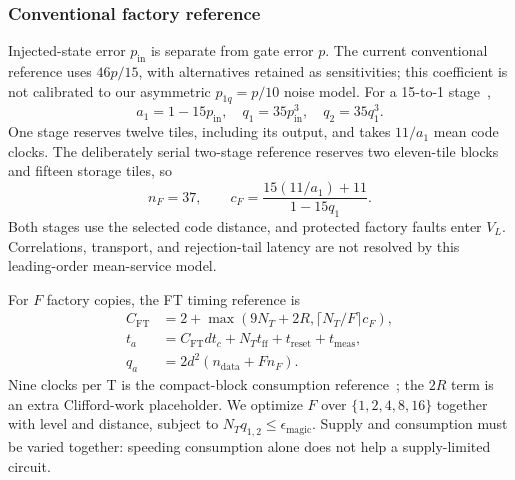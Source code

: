 \documentclass[11pt]{article}
\newcommand{\eps}{\epsilon}
\begin{document}
\subsubsection{Conventional factory reference}
Injected-state error $p_{\mathrm{in}}$ is separate from gate error $p$.
The current conventional reference uses $46p/15$, with alternatives retained
as sensitivities; this coefficient is not calibrated to our asymmetric
$p_{1q}=p/10$ noise model. For a 15-to-1 stage~\cite{litinski},
\begin{equation}
 a_1=1-15p_{\mathrm{in}},\quad q_1=35p_{\mathrm{in}}^3,\quad
 q_2=35q_1^3.
\end{equation}
One stage reserves twelve tiles, including its output, and takes $11/a_1$
mean code clocks. The deliberately serial two-stage reference reserves
two eleven-tile blocks and fifteen storage tiles, so
\begin{equation}
 n_F=37,\qquad c_F=\frac{15(11/a_1)+11}{1-15q_1}.
\end{equation}
Both stages use the selected code distance, and protected factory faults
enter $V_L$. Correlations, transport, and rejection-tail latency are not
resolved by this leading-order mean-service model.

For $F$ factory copies, the FT timing reference is
\begin{align}
 C_{\mathrm{FT}}&=2+\max(9N_T+2R,\lceil N_T/F\rceil c_F),\\
 t_a&=C_{\mathrm{FT}}dt_c+N_Tt_{\mathrm{ff}}+t_{\mathrm{reset}}+t_{\mathrm{meas}},\\
 q_a&=2d^2(n_{\mathrm{data}}+Fn_F).
\end{align}
Nine clocks per T is the compact-block consumption reference~\cite{litinski};
the $2R$ term is an extra Clifford-work placeholder. We optimize $F$ over
$\{1,2,4,8,16\}$ together with level and distance, subject to
$N_Tq_{1,2}\leq\eps_{\mathrm{magic}}$. Supply and consumption must be varied
together: speeding consumption alone does not help a supply-limited circuit.
\end{document}

